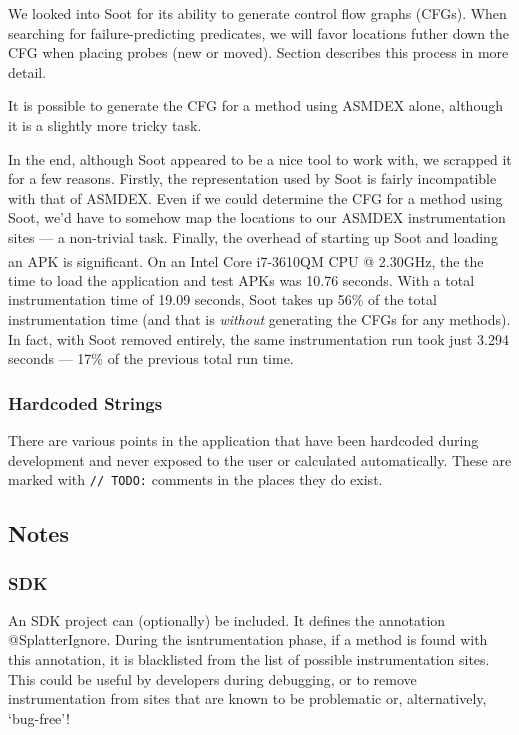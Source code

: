 We looked into Soot for its ability to generate control flow graphs (CFGs). When searching for failure-predicting predicates, we will favor locations futher down the CFG when placing probes (new or moved). Section  describes this process in more detail.

It is possible to generate the CFG for a method using ASMDEX alone, although it is a slightly more tricky task.

In the end, although Soot appeared to be a nice tool to work with, we scrapped it for a few reasons. Firstly, the representation used by Soot is fairly incompatible with that of ASMDEX. Even if we could determine the CFG for a method using Soot, we'd have to somehow map the locations to our ASMDEX instrumentation sites --- a non-trivial task. Finally, the overhead of starting up Soot and loading an APK is significant. On an Intel\textsuperscript{\textregistered} Core\textsuperscript{\texttrademark} i7-3610QM CPU @ 2.30GHz, the the time to load the application and test APKs was 10.76 seconds. With a total instrumentation time of 19.09 seconds, Soot takes up 56\% of the total instrumentation time (and that is \textit{without} generating the CFGs for any methods). In fact, with Soot removed entirely, the same instrumentation run took just 3.294 seconds --- 17\% of the previous total run time.

\subsubsection{Hardcoded Strings}

There are various points in the application that have been hardcoded during development and never exposed to the user or calculated automatically. These are marked with \texttt{// TODO:} comments in the places they do exist.

\subsection{Notes}

\subsubsection{SDK}

An SDK project can (optionally) be included. It defines the annotation @SplatterIgnore. During the isntrumentation phase, if a method is found with this annotation, it is blacklisted from the list of possible instrumentation sites. This could be useful by developers during debugging, or to remove instrumentation from sites that are known to be problematic or, alternatively, {\lq}bug-free{\rq}!

